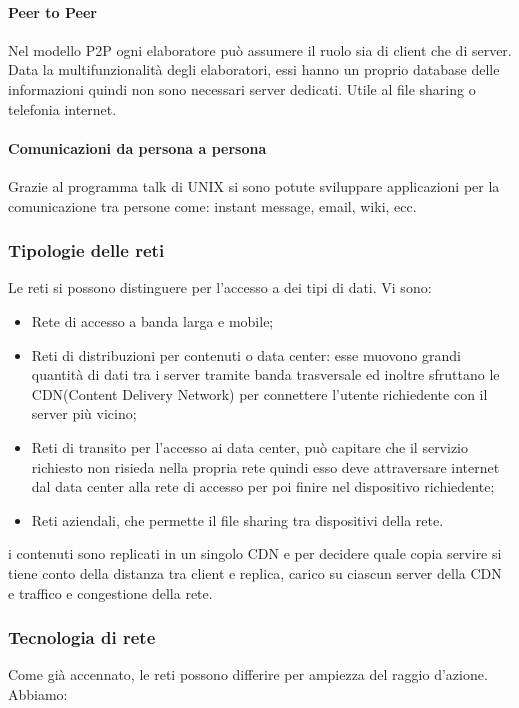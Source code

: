 \documentclass{subfiles}
\begin{document}
    \paragraph{Peer to Peer}
    Nel modello P2P ogni elaboratore può assumere il ruolo sia di client che di server. Data la multifunzionalità degli elaboratori, 
    essi hanno un proprio database delle informazioni quindi non sono necessari server dedicati. Utile al file sharing o telefonia 
    internet.

    \paragraph{Comunicazioni da persona a persona}
    Grazie al programma talk di UNIX si sono potute sviluppare applicazioni per la comunicazione tra persone come: instant message, 
    email, wiki, ecc.

\subsubsection{Tipologie delle reti}
    Le reti si possono distinguere per l'accesso a dei tipi di dati. Vi sono:
    \begin{itemize}
        \item Rete di accesso a banda larga e mobile;
        \item Reti di distribuzioni per contenuti o data center: esse muovono grandi quantità di dati tra i server tramite banda 
        trasversale ed inoltre sfruttano le CDN(Content Delivery Network) per connettere l'utente richiedente con il server più vicino;
        \item Reti di transito per l'accesso ai data center, può capitare che il servizio richiesto non risieda nella propria rete 
        quindi esso deve attraversare internet dal data center alla rete di accesso per poi finire nel dispositivo richiedente;
        \item Reti aziendali, che permette il file sharing tra dispositivi della rete.
    \end{itemize}
    \begin{Note*}
        i contenuti sono replicati in un singolo CDN e per decidere quale copia servire si tiene conto della distanza tra client e 
        replica, carico su ciascun server della CDN e traffico e congestione della rete.
    \end{Note*}

\subsubsection{Tecnologia di rete}
    Come già accennato, le reti possono differire per ampiezza del raggio d'azione. Abbiamo:
\end{document}
